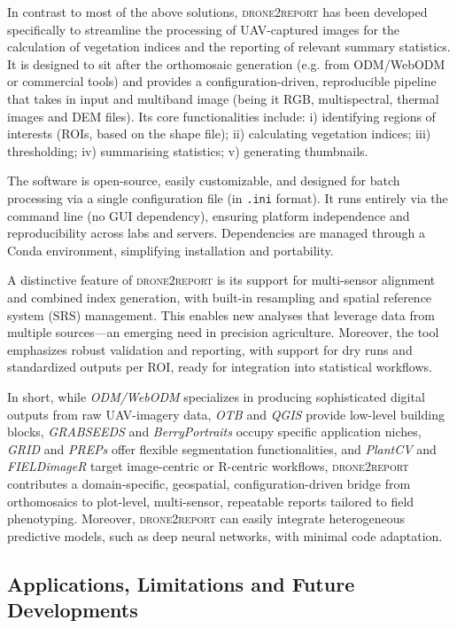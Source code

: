 \documentclass[drones,technicalnote,accept,pdftex,moreauthors]{Definitions/mdpi}
\begin{document}
In contrast to most of the above solutions, \textsc{drone2report} has been developed specifically to streamline the processing of UAV-captured images for the calculation of vegetation indices and the reporting of relevant summary statistics.
It is designed to sit after the orthomosaic generation (e.g. from ODM/WebODM or commercial tools) and provides a configuration-driven, reproducible pipeline that takes in input and multiband image (being it RGB, multispectral, thermal images and DEM files).  Its core functionalities include: i) identifying regions of interests (ROIs, based on the shape file); ii) calculating vegetation indices; iii) thresholding; iv) summarising statistics; v) generating thumbnails.

The software is open-source, easily customizable, and designed for batch processing via a single configuration file (in \texttt{.ini} format). It runs entirely via the command line (no GUI dependency), ensuring platform independence and reproducibility across labs and servers. Dependencies are managed through a Conda environment, simplifying installation and portability.

A distinctive feature of \textsc{drone2report} is its support for multi-sensor alignment and combined index generation, with built-in resampling and spatial reference system (SRS) management. This enables new analyses that leverage data from multiple sources—an emerging need in precision agriculture. Moreover, the tool emphasizes robust validation and reporting, with support for dry runs and standardized outputs per ROI, ready for integration into statistical workflows.

In short, while \textit{ODM/WebODM} specializes in producing sophisticated digital outputs from raw UAV-imagery data, \textit{OTB} and \textit{QGIS} provide low-level building blocks, \textit{GRABSEEDS} and \textit{BerryPortraits} occupy specific application niches, \textit{GRID} and \textit{PREPs} offer flexible segmentation functionalities, and \textit{PlantCV} and \textit{FIELDimageR} target image-centric or R-centric workflows, \textsc{drone2report} contributes a domain-specific, geospatial, configuration-driven bridge from orthomosaics to plot-level, multi-sensor, repeatable reports tailored to field phenotyping. Moreover, \textsc{drone2report} can easily integrate heterogeneous predictive models, such as deep neural networks, with minimal code adaptation.

\subsection{Applications, Limitations and Future Developments}
\end{document}
